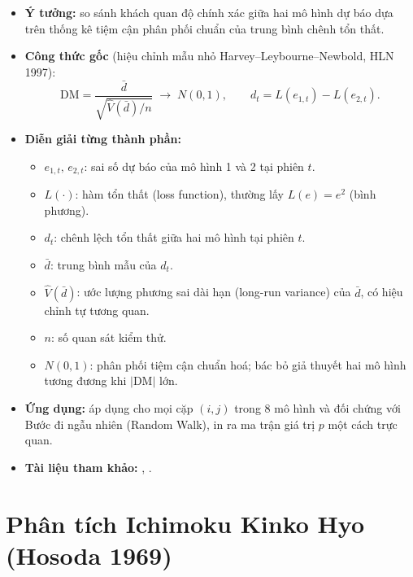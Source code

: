 \documentclass[12pt,a4paper,openany,oneside]{report}
\numberwithin{equation}{chapter}
\begin{document}
\begin{itemize}[leftmargin=18pt,topsep=2pt,itemsep=4pt]
  \item \textbf{Ý tưởng:} so sánh khách quan độ chính xác giữa hai mô
        hình dự báo dựa trên thống kê tiệm cận phân phối chuẩn của
        trung bình chênh tổn thất.
  \item \textbf{Công thức gốc} (hiệu chỉnh mẫu nhỏ
        Harvey--Leybourne--Newbold, HLN 1997):
        \begin{equation}
          \text{DM} = \frac{\bar{d}}{\sqrt{\hat{V}(\bar{d})/n}} \;\to\; N(0,1),
          \qquad d_t = L(e_{1,t}) - L(e_{2,t}).
          \label{eq:dm}
        \end{equation}
  \item \textbf{Diễn giải từng thành phần:}
        \begin{itemize}[leftmargin=14pt,topsep=2pt,itemsep=1pt]
          \item $e_{1,t},\,e_{2,t}$: sai số dự báo của mô hình 1 và 2
                tại phiên $t$.
          \item $L(\cdot)$: hàm tổn thất (loss function), thường lấy
                $L(e) = e^2$ (bình phương).
          \item $d_t$: chênh lệch tổn thất giữa hai mô hình tại phiên $t$.
          \item $\bar{d}$: trung bình mẫu của $d_t$.
          \item $\hat{V}(\bar{d})$: ước lượng phương sai dài hạn (long-run
                variance) của $\bar{d}$, có hiệu chỉnh tự tương quan.
          \item $n$: số quan sát kiểm thử.
          \item $N(0,1)$: phân phối tiệm cận chuẩn hoá; bác bỏ giả thuyết
                hai mô hình tương đương khi $|\mathrm{DM}|$ lớn.
        \end{itemize}
  \item \textbf{Ứng dụng:} áp dụng cho mọi cặp $(i, j)$ trong 8 mô hình
        và đối chứng với Bước đi ngẫu nhiên (Random Walk), in ra ma trận
        giá trị $p$ một cách trực quan.
  \item \textbf{Tài liệu tham khảo:} \citet{DieboldMariano1995},
        \citet{HarveyLeybourneNewbold1997}.
\end{itemize}

\section{Phân tích Ichimoku Kinko Hyo (Hosoda 1969)}
\end{document}
